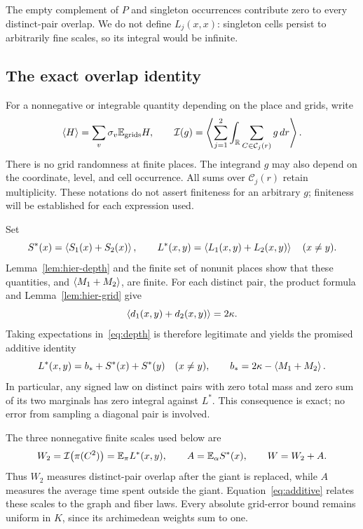 The empty complement of $P$ and singleton occurrences contribute
zero to every distinct-pair overlap.  We do not define $L_j(x,x)$:
singleton cells persist to arbitrarily fine scales, so its integral
would be infinite.

\subsection{The exact overlap identity}

For a nonnegative or integrable quantity depending on the place
and grids, write
\[
 \left\langle H\right\rangle=\sum_v\sigma_v\mathbb E_{\mathrm{grids}}H,
 \qquad
 \mathcal I(g)=\left\langle \sum_{j=1}^2\int_\mathbb R
                   \sum_{C\in\mathcal C_j(r)}g\,dr\right\rangle.
\]
There is no grid randomness at finite places.  The integrand $g$
may also depend on the coordinate, level, and cell occurrence.
All sums over $\mathcal C_j(r)$ retain multiplicity.  These
notations do not assert finiteness for an arbitrary $g$; finiteness
will be established for each expression used.

Set
\[
 S^*(x)=\left\langle S_1(x)+S_2(x)\right\rangle,\qquad
 L^*(x,y)=\left\langle L_1(x,y)+L_2(x,y)\right\rangle\quad(x\ne y).
\]
Lemma~\ref{lem:hier-depth} and the finite set of nonunit places show
that these quantities, and $\left\langle M_1+M_2\right\rangle$, are finite.  For each
distinct pair, the product formula and Lemma~\ref{lem:hier-grid}
give
\[
 \left\langle d_1(x,y)+d_2(x,y)\right\rangle=2\kappa.
\]
Taking expectations in~\eqref{eq:depth} is therefore legitimate and
yields the promised additive identity
\begin{equation}\label{eq:additive}
 L^*(x,y)=b_*+S^*(x)+S^*(y)\quad(x\ne y),
 \qquad b_*=2\kappa-\left\langle M_1+M_2\right\rangle.
\end{equation}
In particular, any signed law on distinct pairs with zero total
mass and zero sum of its two marginals has zero integral against
$L^*$.  This consequence is exact; no error from sampling a
diagonal pair is involved.

The three nonnegative finite scales used below are
\begin{equation}\label{eq:hier-scales}
 W_2=\mathcal I\bigl(\pi(C^2)\bigr)=\mathbb E_\pi L^*(x,y),\qquad
 A=\mathbb E_\alpha S^*(x),\qquad W=W_2+A.
\end{equation}
Thus $W_2$ measures distinct-pair overlap after the giant is
replaced, while $A$ measures the average time spent outside the
giant.  Equation~\eqref{eq:additive} relates these scales to the
graph and fiber laws.  Every absolute grid-error bound remains
uniform in $K$, since its archimedean weights sum to one.
